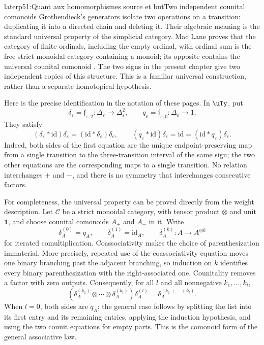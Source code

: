 \begin{dcomment}{later}{p51:Quant aux homomorphismes source et but}{Two independent counital comonoids}
Grothendieck's generators isolate two operations on a transition: duplicating it into a directed chain and deleting it. Their algebraic meaning is the standard universal property of the simplicial category. Mac Lane proves that the category of finite ordinals, including the empty ordinal, with ordinal sum is the free strict monoidal category containing a monoid; its opposite contains the universal counital comonoid \citep[Chapter VII, \S5, Proposition~1, pp.~175--176; \S6, p.~181]{MacLane1998}. The two signs in the present chapter give two independent copies of this structure. This is a familiar universal construction, rather than a separate homotopical hypothesis.

Here is the precise identification in the notation of these pages. In $\uTy$, put
\[
 \delta_\varepsilon=\mathfrak f_{\varepsilon,2}:
 \Delta_\varepsilon\longrightarrow\Delta_\varepsilon^2,
 \qquad
 q_\varepsilon=\mathfrak f_{\varepsilon,0}:
 \Delta_\varepsilon\longrightarrow1.
\]
They satisfy
\[
 (\delta_\varepsilon*\mathrm{id})\delta_\varepsilon
  =(\mathrm{id}*\delta_\varepsilon)\delta_\varepsilon,
 \qquad
 (q_\varepsilon*\mathrm{id})\delta_\varepsilon
  =\mathrm{id}
  =(\mathrm{id}*q_\varepsilon)\delta_\varepsilon.
\]
Indeed, both sides of the first equation are the unique endpoint-preserving map from a single transition to the three-transition interval of the same sign; the two other equations are the corresponding maps to a single transition. No relation interchanges $+$ and $-$, and there is no symmetry that interchanges consecutive factors.

For completeness, the universal property can be proved directly from the weight description. Let $\mathcal C$ be a strict monoidal category, with tensor product $\otimes$ and unit $\mathbf1$, and choose counital comonoids $A_+$ and $A_-$ in it. Write
\[
 \delta_A^{(0)}=q_A,\qquad
 \delta_A^{(1)}=\mathrm{id}_A,\qquad
 \delta_A^{(k)}:A\longrightarrow A^{\otimes k}
\]
for iterated comultiplication. Coassociativity makes the choice of parenthesization immaterial. More precisely, repeated use of the coassociativity equation moves one binary branching past the adjacent branching, so induction on $k$ identifies every binary parenthesization with the right-associated one. Counitality removes a factor with zero outputs. Consequently, for all $l$ and all nonnegative $k_1,\ldots,k_l$,
\[
 (\delta_A^{(k_1)}\otimes\cdots\otimes\delta_A^{(k_l)})
 \delta_A^{(l)}=\delta_A^{(k_1+\cdots+k_l)}.
\]
When $l=0$, both sides are $q_A$; the general case follows by splitting the list into its first entry and its remaining entries, applying the induction hypothesis, and using the two counit equations for empty parts. This is the comonoid form of the general associative law.


\end{dcomment}
